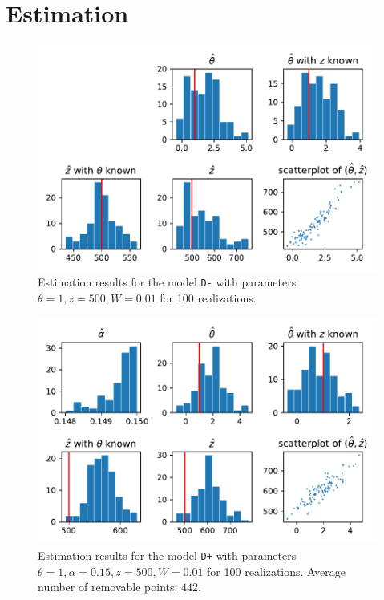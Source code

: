 \section{Estimation}

\begin{figure}
  \centering
    \includegraphics[width=1\textwidth]{"../img/numeric/estimation - type_D-_theta_1"}
  \caption{Estimation results for the model \texttt{D-} with parameters $\theta=1,z=500,W=0.01$ for 100 realizations.}
\end{figure}


\begin{figure}
  \centering
    \includegraphics[width=1\textwidth]{"../img/numeric/estimation - type_D+_theta_1"}
  \caption{Estimation results for the model \texttt{D+} with parameters $\theta=1,\alpha=0.15,z=500,W=0.01$ for 100 realizations. Average number of removable points: $442$.}
\end{figure}

